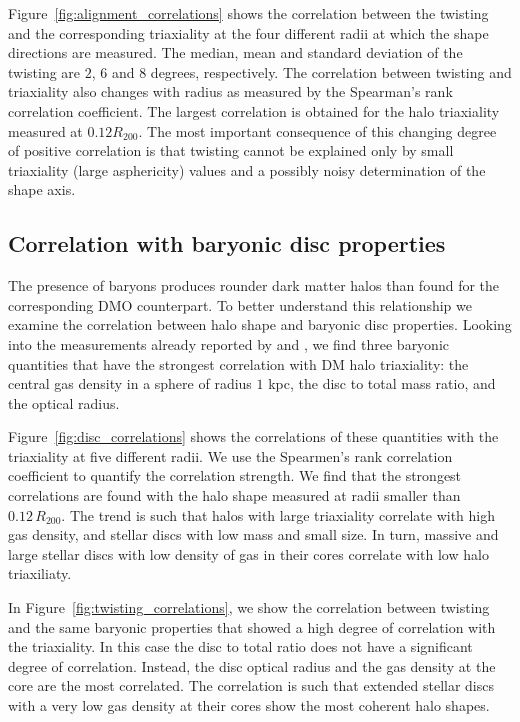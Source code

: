 \documentclass[usenatbib]{mnras}
\begin{document}
Figure~\ref{fig:alignment_correlations} shows the correlation between
the twisting and the corresponding triaxiality at the four different
radii at which the shape directions are measured.
The median, mean and standard deviation of the twisting 
are $2$, $6$ and $8$ degrees, respectively.
The correlation between twisting and triaxiality also changes with
radius as measured by the Spearman's rank correlation coefficient.
The largest correlation is obtained for the halo triaxiality measured at
$0.12R_{200}$. 
The most important consequence of this changing degree of positive
correlation is that twisting cannot be explained only by small
triaxiality (large asphericity) values and a possibly noisy
determination of the shape axis. 

\subsection{Correlation with baryonic disc properties}

The presence of baryons produces rounder dark matter halos than found for the 
corresponding DMO counterpart. 
To better understand this relationship we examine the correlation
between halo shape and baryonic disc properties.  
Looking into the measurements already reported by \cite{auriga} and
\cite{Pakmor17}, we find three baryonic quantities that have the
strongest correlation with DM halo triaxiality: the central gas
density in a sphere of radius $1$ kpc, the disc to total mass ratio, and
the optical radius. 

Figure~\ref{fig:disc_correlations} shows the correlations of
these quantities with the triaxiality at five different radii.
We use the Spearmen's rank correlation coefficient to quantify the
correlation strength. 
We find that the strongest correlations are found with the halo shape
measured at radii smaller than $0.12\, R_{200}$.
The  trend is such that halos with large triaxiality correlate with
high gas density, and stellar discs with low mass and small size. 
In turn, massive and large stellar discs with low density of
gas in their cores correlate with low halo triaxiliaty. 

In Figure~\ref{fig:twisting_correlations}, we show the correlation
between twisting and the same baryonic properties that showed a high
degree of correlation with the triaxiality.
In this case the disc to total ratio does not have a significant
degree of correlation. Instead, the disc optical radius and the gas density
at the core are the most correlated. 
The correlation is such that extended stellar discs with a very low
gas density at their cores show the most coherent halo shapes.  
\end{document}
